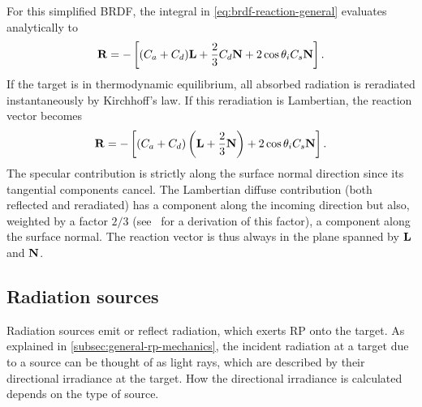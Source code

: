 For this simplified \gls{BRDF}, the integral in \cref{eq:brdf-reaction-general} evaluates analytically to~\cite{Montenbruck2014}
\begin{align}
    \label{eq:brdf-reaction-specular-diffuse}
    \vb R = - \left[ (C_a + C_d) \vb L + \frac{2}{3} C_d \vb N + 2 \cos\theta_i C_s \vb N \right].
\end{align}
If the target is in thermodynamic equilibrium, all absorbed radiation is reradiated instantaneously by Kirchhoff's law. If this reradiation is Lambertian, the reaction vector becomes~\cite{Montenbruck2014}
\begin{align}
    \label{eq:brdf-reaction-specular-diffuse-instrerad}
    \vb R = - \left[ (C_a + C_d) \left(\vb L + \frac{2}{3} \vb N\right) + 2 \cos\theta_i C_s \vb N \right].
\end{align}
The specular contribution is strictly along the surface normal direction since its tangential components cancel. The Lambertian diffuse contribution (both reflected and reradiated) has a component along the incoming direction but also, weighted by a factor $2/3$ (see~\cite{Ziebart2004} for a derivation of this factor), a component along the surface normal. The reaction vector is thus always in the plane spanned by $\vb L$ and $\vb N$.



\subsection{Radiation sources}
\label{subsec:radiation-sources}

Radiation sources emit or reflect radiation, which exerts \gls{RP} onto the target. As explained in \cref{subsec:general-rp-mechanics}, the incident radiation at a target due to a source can be thought of as light rays, which are described by their directional irradiance at the target. How the directional irradiance is calculated depends on the type of source.

